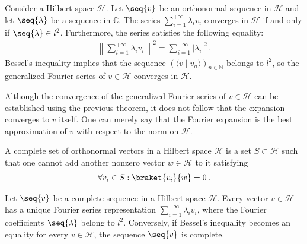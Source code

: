     \begin{theorem}
        Consider a Hilbert space $\mathcal{H}$. Let $\seq{v}$ be an orthonormal sequence in $\mathcal{H}$ and let $\seq{\lambda}$ be a sequence in $\mathbb{C}$. The series $\sum_{i=1}^{+\infty}\lambda_iv_i$ converges in $\mathcal{H}$ if and only if $\seq{\lambda}\in l^2$. Furthermore, the series satisfies the following equality:
        \begin{gather}
            \left\|\sum_{i=1}^{+\infty}\lambda_iv_i\right\|^2 = \sum_{i=1}^{+\infty}|\lambda_i|^2\,.
        \end{gather}
        Bessel's inequality implies that the sequence $(\langle v\mid v_n \rangle)_{n\in\mathbb{N}}$ belongs to $l^2$, so the generalized Fourier series of $v\in\mathcal{H}$ converges in $\mathcal{H}$.
    \end{theorem}
    \begin{remark}
        Although the convergence of the generalized Fourier series of $v\in\mathcal{H}$ can be established using the previous theorem, it does not follow that the expansion converges to $v$ itself. One can merely say that the Fourier expansion is the best approximation of $v$ with respect to the norm on $\mathcal{H}$.
    \end{remark}

    \begin{adefinition}
        A complete set of orthonormal vectors in a Hilbert space $\mathcal{H}$ is a set $S\subset\mathcal{H}$ such that one cannot add another nonzero vector $w\in\mathcal{H}$ to it satisfying
        \begin{gather}
            \forall v_i\in S:\braket{v_i}{w}=0\,.
        \end{gather}
    \end{adefinition}

    \begin{theorem}[Parceval]
        Let $\seq{v}$ be a complete sequence in a Hilbert space $\mathcal{H}$. Every vector $v\in\mathcal{H}$ has a unique Fourier series representation $\sum_{i=1}^{+\infty}\lambda_iv_i$, where the Fourier coefficients $\seq{\lambda}$ belong to $l^2$. Conversely, if Bessel's inequality becomes an equality for every $v\in\mathcal{H}$, the sequence $\seq{v}$ is complete.
    \end{theorem}

